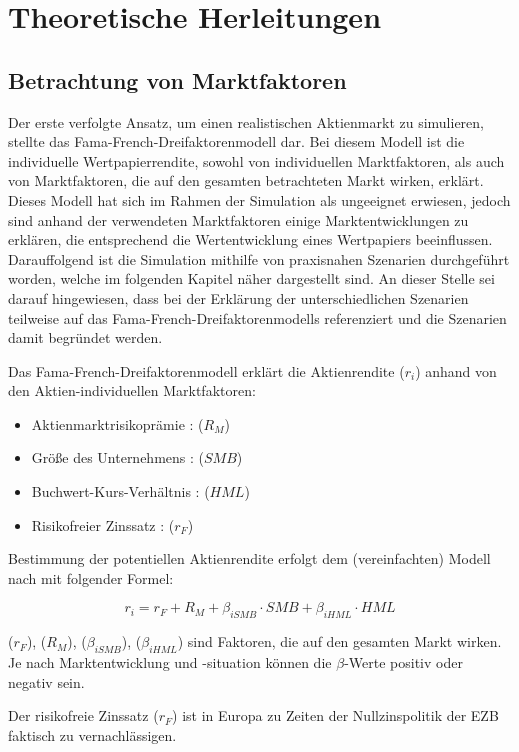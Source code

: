 \chapter{Theoretische Herleitungen}
\section{Betrachtung von Marktfaktoren}

Der erste verfolgte Ansatz, um einen realistischen Aktienmarkt zu simulieren, stellte das Fama-French-Dreifaktorenmodell dar. Bei diesem Modell ist die individuelle Wertpapierrendite, sowohl von individuellen Marktfaktoren, als auch von Marktfaktoren, die auf den gesamten betrachteten Markt wirken, erklärt. \\
Dieses Modell hat sich im Rahmen der Simulation als ungeeignet erwiesen, jedoch sind anhand der verwendeten Marktfaktoren einige Marktentwicklungen zu erklären, die entsprechend die Wertentwicklung eines Wertpapiers beeinflussen.\\
Darauffolgend ist die Simulation mithilfe von praxisnahen Szenarien durchgeführt worden, welche im folgenden Kapitel näher dargestellt sind. An dieser Stelle sei darauf hingewiesen, dass bei der Erklärung der unterschiedlichen Szenarien teilweise auf das Fama-French-Dreifaktorenmodells referenziert und die Szenarien damit begründet werden.

Das Fama-French-Dreifaktorenmodell erklärt die Aktienrendite ($r_i$) anhand von den Aktien-individuellen Marktfaktoren:
\begin{itemize}
	\item Aktienmarktrisikoprämie : ($R_M$)
	\item Größe des Unternehmens : (${SMB}$)
	\item Buchwert-Kurs-Verhältnis : ($HML$)
	\item Risikofreier Zinssatz : ($r_F$)
\end{itemize}

Bestimmung der potentiellen Aktienrendite erfolgt dem (vereinfachten) Modell nach mit folgender Formel:

$$ r_i = r_F + R_M + \beta_{iSMB} \cdot SMB + \beta_{iHML} \cdot HML$$

($r_F$), ($R_M$), ($\beta_{iSMB}$), ($\beta_{iHML}$) sind Faktoren, die auf den gesamten Markt wirken. Je nach Marktentwicklung und -situation können die $\beta$-Werte positiv oder negativ sein.

Der risikofreie Zinssatz ($r_F$) ist in Europa zu Zeiten der Nullzinspolitik der EZB faktisch zu vernachlässigen.

